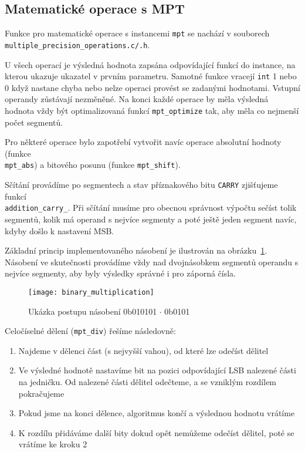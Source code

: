 \subsection{Matematické operace s MPT}\label{subsection:mpt_operace}
Funkce pro matematické operace s instancemi \verb|mpt| se nachází v souborech \\\verb|multiple_precision_operations.c/.h|.

U všech operací je výsledná hodnota zapsána odpovídající funkcí do instance, na kterou ukazuje ukazatel v prvním parametru. Samotné funkce vracejí \verb|int| 1 nebo 0 když nastane chyba nebo nelze operaci provést se zadanými hodnotami. Vstupní operandy zůstávají nezměněné. Na konci každé operace by měla výsledná hodnota vždy být optimalizovaná funkcí \verb|mpt_optimize| tak, aby měla co nejmenší počet segmentů. 

Pro některé operace bylo zapotřebí vytvořit navíc operace absolutní hodnoty (funkce \\ \verb|mpt_abs|) a bitového posunu (funkce \verb|mpt_shift|).

Sčítání provádíme po segmentech a stav příznakového bitu \verb|CARRY| zjišťujeme funkcí \\\verb|addition_carry_|. Při sčítání musíme pro obecnou správnost výpočtu sečíst tolik segmentů, kolik má operand s nejvíce segmenty a poté ještě jeden segment navíc, kdyby došlo k nastavení MSB.

Základní princip implementovaného násobení je ilustrován na obrázku~\ref{fig:binary_multiplication}.
Násobení ve skutečnosti provádíme vždy nad dvojnásobkem segmentů operandu s nejvíce segmenty, aby byly výsledky správné i pro záporná čísla.

\begin{figure}[ht]
    \centering
    \texttt{[image: binary\_multiplication]}
    \caption{Ukázka postupu násobení 0b010101 $\cdot{}$ 0b0101}\label{fig:binary_multiplication}
\end{figure}

Celočíselné dělení (\verb|mpt_div|) řešíme následovně:
\begin{enumerate}
    \item Najdeme v dělenci část (s nejvyšší vahou), od které lze odečíst dělitel
    \item Ve výsledné hodnotě nastavíme bit na pozici odpovídající LSB nalezené části na jedničku. Od nalezené části dělitel odečteme, a se vzniklým rozdílem pokračujeme
    \item Pokud jsme na konci dělence, algoritmus končí a výslednou hodnotu vrátíme
    \item K rozdílu přidáváme další bity dokud opět nemůžeme odečíst dělitel, poté se vrátíme ke kroku 2 
\end{enumerate}

